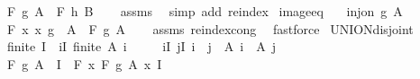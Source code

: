 \begin{isabellebody}
\ \ \ {\isachardoublequoteopen}F\ g\ A\ {\isacharequal}{\kern0pt}\ F\ h\ B{\isachardoublequoteclose}\isanewline
%
\isadelimproof
\ \ %
\endisadelimproof
%
\isatagproof
{}\isamarkupfalse%
\ assms\ \isamarkupfalse%
\ {\isacharparenleft}{\kern0pt}simp\ add{\isacharcolon}{\kern0pt}\ reindex{\isacharparenright}{\kern0pt}%
\endisatagproof
{\isafoldproof}%
%
\isadelimproof
\isanewline
%
\endisadelimproof
\isanewline
{}\isamarkupfalse%
\ image{\isacharunderscore}{\kern0pt}eq{\isacharcolon}{\kern0pt}\isanewline
\ \ \ {\isachardoublequoteopen}inj{\isacharunderscore}{\kern0pt}on\ g\ A{\isachardoublequoteclose}\ \ \isanewline
\ \ \ {\isachardoublequoteopen}F\ {\isacharparenleft}{\kern0pt}{\isasymlambda}x{\isachardot}{\kern0pt}\ x{\isacharparenright}{\kern0pt}\ {\isacharparenleft}{\kern0pt}g\ {\isacharbackquote}{\kern0pt}\ A{\isacharparenright}{\kern0pt}\ {\isacharequal}{\kern0pt}\ F\ g\ A{\isachardoublequoteclose}\isanewline
%
\isadelimproof
\ \ %
\endisadelimproof
%
\isatagproof
{}\isamarkupfalse%
\ assms\ reindex{\isacharunderscore}{\kern0pt}cong\ \isamarkupfalse%
\ fastforce%
\endisatagproof
{\isafoldproof}%
%
\isadelimproof
\isanewline
%
\endisadelimproof
\isanewline
{}\isamarkupfalse%
\ UNION{\isacharunderscore}{\kern0pt}disjoint{\isacharcolon}{\kern0pt}\isanewline
\ \ \ {\isachardoublequoteopen}finite\ I{\isachardoublequoteclose}\ \ {\isachardoublequoteopen}{\isasymforall}i{\isasymin}I{\isachardot}{\kern0pt}\ finite\ {\isacharparenleft}{\kern0pt}A\ i{\isacharparenright}{\kern0pt}{\isachardoublequoteclose}\isanewline
\ \ \ \ \ {\isachardoublequoteopen}{\isasymforall}i{\isasymin}I{\isachardot}{\kern0pt}\ {\isasymforall}j{\isasymin}I{\isachardot}{\kern0pt}\ i\ {\isasymnoteq}\ j\ {\isasymlongrightarrow}\ A\ i\ {\isasyminter}\ A\ j\ {\isacharequal}{\kern0pt}\ {\isacharbraceleft}{\kern0pt}{\isacharbraceright}{\kern0pt}{\isachardoublequoteclose}\isanewline
\ \ \ {\isachardoublequoteopen}F\ g\ {\isacharparenleft}{\kern0pt}{\isasymUnion}{\isacharparenleft}{\kern0pt}A\ {\isacharbackquote}{\kern0pt}\ I{\isacharparenright}{\kern0pt}{\isacharparenright}{\kern0pt}\ {\isacharequal}{\kern0pt}\ F\ {\isacharparenleft}{\kern0pt}{\isasymlambda}x{\isachardot}{\kern0pt}\ F\ g\ {\isacharparenleft}{\kern0pt}A\ x{\isacharparenright}{\kern0pt}{\isacharparenright}{\kern0pt}\ I{\isachardoublequoteclose}\isanewline
%
\isadelimproof
\ \ %
\endisadelimproof
%
\isatagproof
{}\isamarkupfalse%

\end{isabellebody}
